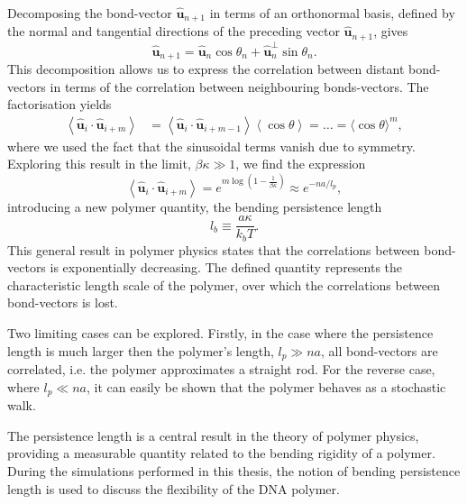 Decomposing the bond-vector $\boldsymbol{\hat{u}}_{n+1}$ in terms of an orthonormal
basis, defined by the normal and tangential directions of the preceding vector
$\boldsymbol{\hat{u}}_{n+1}$, gives
\begin{equation}
\boldsymbol{\hat{u}}_{n+1} = \boldsymbol{\hat{u}}_{n} \cos \theta_{n} +
\boldsymbol{\hat{u}}_{n}^{\perp} \sin \theta_{n}.
\end{equation}
This decomposition allows us to express the correlation between distant bond-vectors in
terms of the correlation between neighbouring bonds-vectors. The factorisation
yields
\begin{equation}
\begin{aligned}
    \left\langle\boldsymbol{\hat{u}}_{i} \cdot \boldsymbol{\hat{u}}_{i+m}\right\rangle
    &=\left\langle\boldsymbol{\hat{u}}_{i} \cdot
        \boldsymbol{\hat{u}}_{i+m-1}\right\rangle\left\langle\cos
    \theta\right\rangle = \dots =\langle\cos \theta\rangle^{m},
\end{aligned}
\end{equation}
where we used the fact that the sinusoidal terms vanish due to symmetry.
Exploring this result in the limit, $\beta \kappa \gg 1$, we find the expression
\begin{equation}
    \left\langle\boldsymbol{\hat{u}}_{i} \cdot \boldsymbol{\hat{u}}_{i+m}\right\rangle =
    e^{m \log(1 - \frac{1}{\beta \kappa})} \approx e^{-na/l_p},
\end{equation}
introducing a new polymer quantity, the bending persistence length
\begin{equation}
    l_b \equiv \frac{a \kappa}{k_{b} T}.
\end{equation}
This general result in polymer physics states that the correlations between bond-vectors
is exponentially decreasing. The defined quantity represents the characteristic
length scale of the polymer, over which the correlations between
bond-vectors is lost.

Two limiting cases can be explored. Firstly, in the
case where the persistence length is much larger then the polymer's length, $l_p \gg na$,
all bond-vectors are correlated, i.e. the polymer approximates a straight rod. For the
reverse case, where $l_p \ll na$, it can easily be shown that the polymer behaves as a
stochastic walk.

The persistence length is a central result in the theory of polymer physics, providing a
measurable quantity related to the bending rigidity of a polymer. During the
simulations performed in this thesis, the notion of bending persistence length is used to
discuss the flexibility of the DNA polymer.

